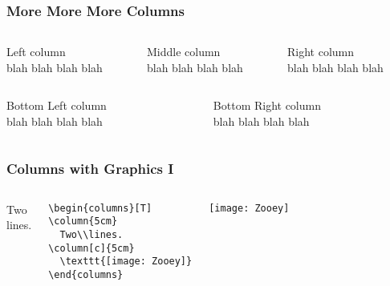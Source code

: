 \begin{frame}
\frametitle{More More More Columns}

\vfill

\begin{columns}
  \begin{column}{.33\textwidth}
    Left column\\
    blah blah blah blah\\
  \end{column}

  \begin{column}{.33\textwidth}
    Middle column\\
    blah blah blah blah\\
  \end{column}

  \begin{column}{.33\textwidth}
    Right column\\
    blah blah blah blah\\
  \end{column}
\end{columns}

\vfill

\begin{columns}
  \begin{column}{.5\textwidth}
    Bottom Left column\\
    blah blah blah blah\\
  \end{column}

  \begin{column}{.5\textwidth}
    Bottom Right column\\
    blah blah blah blah\\
  \end{column}
\end{columns}

\end{frame}
\begin{frame}[fragile]
\frametitle{Columns with Graphics \textrm{I}}

\begin{columns}[T]
  \column{5cm}
    Two\\lines.
    \begin{tiny}
      \begin{verbatim}
\begin{columns}[T]
\column{5cm}
  Two\\lines.
\column[c]{5cm}
  \texttt{[image: Zooey]}
\end{columns}
      \end{verbatim}
    \end{tiny}
  \column[c]{5cm}
    \centerline{\texttt{[image: Zooey]}}
\end{columns}

\end{frame}
